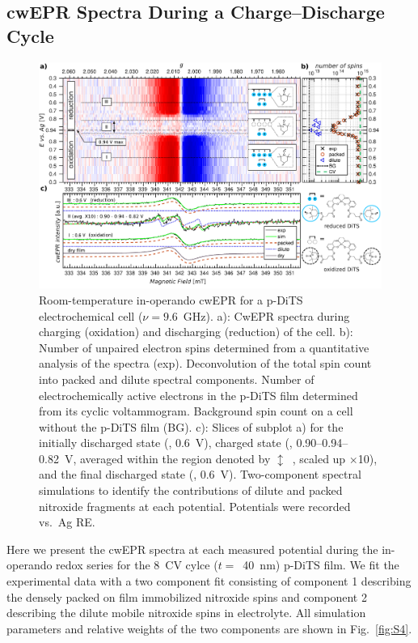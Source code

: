 \subsection{cwEPR Spectra During a Charge--Discharge Cycle}
\label{sec:operando_dits}

\begin{figure}[H]
\center
	\includegraphics[width=1\textwidth]{./operando_epr/figures/Main_2D_redox_map_full.pdf}
	\caption{Room-temperature in-operando cwEPR for a p-DiTS electrochemical cell ($\nu = 9.6$~GHz). a): CwEPR spectra during charging (oxidation) and discharging (reduction) of the cell. b): Number of unpaired electron spins determined from a quantitative analysis of the spectra (exp). Deconvolution of the total spin count into packed and dilute spectral components. Number of electrochemically active electrons in the p-DiTS film determined from its cyclic voltammogram. Background spin count on a cell without the p-DiTS film (BG). c): Slices of subplot a) for the initially discharged state (, 0.6~V), charged state (, 0.90--0.94--0.82~V, averaged within the region denoted by $\updownarrow$~, scaled up $\times$10), and the final discharged state (, 0.6~V). Two-component spectral simulations to identify the contributions of dilute and packed nitroxide fragments at each potential. Potentials were recorded vs.\ Ag RE.}
	\label{fig:operando_carpet}
\end{figure}


Here we present the cwEPR spectra at each measured potential during the in-operando redox series for the 8~CV cylce ($t=$~40~nm) p-DiTS film. We fit the experimental data with a two component fit consisting of component 1 describing the densely packed on film immobilized nitroxide spins and component 2 describing the dilute mobile nitroxide spins in electrolyte. All simulation parameters and relative weights of the two components are shown in Fig.~\ref{fig:S4}.

